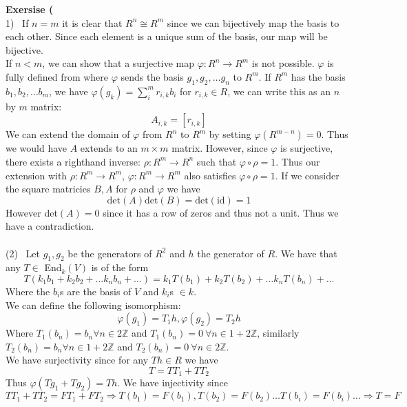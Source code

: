 \documentclass[12pt]{article}
\newenvironment{ques}[1]{\textbf{Exersise #1}\vspace{1 mm}\\ }{\bigskip}
\theoremstyle{definition}
\newcommand{\Z}{\mathbb Z}
\begin{document}
\begin{ques}{6.2}
	(1) \ If $n = m$ it is clear that $R^n \cong R^m$ since we can bijectively
	map the basis to each other. Since each element is a unique sum of the
	basis, our map will be bijective.\\
	If $n < m$, we can show that a surjective map $\varphi : R^n \to
	R^m$ is not possible. $\varphi$ is fully defined from where $\varphi$ sends
	the basis $g_1, g_2, \dots g_n$ to $R^m$. If $R^m$ has the basis $b_1,b_2, \dots
	b_m$, we have $\varphi(g_k) = \sum_i^m r_{i,k}b_i$ for $r_{i,k} \in R$, we can
	write this as an $n$ by $m$ matrix:
	$$A_{i,k} = [r_{i,k}]$$
	We can extend the domain of $\varphi$ from $R^n$ to $R^m$ by setting
	$\varphi(R^{m-n}) = 0$. Thus we would have $A$ extends to an $m \times m$
	matrix. However, since $\varphi$ is surjective, there exists a righthand
	inverse: $\rho : R^m \to R^n$ such that $\varphi \circ \rho = 1$. Thus our
	extension with $\rho: R^m \to R^m$, $\varphi: R^m \to R^m$ also satisfies
	$\varphi \circ \rho = 1$. If we consider the square matricies $B, A$
	for $\rho$ and $\varphi$ we have $$\text{det}(A) \text{det}(B) =
	\text{det}(\text{id}) = 1$$ However det$(A) = 0$ since it has a row of
	zeros and thus not a unit. Thus we have a contradiction.\\
	\\
	(2) \ Let $g_1, g_2$ be the generators of $R^2$ and $h$ the generator of
	$R$. We have that any $T \in$ End$_k(V)$ is of the form 
	$$T(k_1b_1 + k_2b_2 + \dots k_nb_n + \dots) =  k_1T(b_1) + k_2T(b_2) +
	\dots k_nT(b_n) + \dots $$
	Where the $b_i$s are the basis of $V$ and $k_i$s $\in k$.\\
	We can define the following isomorphism:\\
	$$\varphi(g_1) = T_1h, \varphi (g_2) = T_2 h$$
	Where $T_1(b_n) = b_n \forall n \in 2\Z$ and $T_1(b_n) = 0\  \forall n \in
	1 + 2\Z$, similarly $T_2(b_n) = b_n \forall n \in 1 + 2\Z$ and $T_2(b_n) =
	0\  \forall n \in 2\Z$. \\
	We have surjectivity since for any $Th \in R$ we have
	$$T = TT_1 + TT_2$$
	Thus $\varphi(Tg_1 + Tg_2) = Th$. We have injectivity since $TT_1 + TT_2 =
	FT_1 + FT_2 \Rightarrow T(b_1) = F(b_1), T(b_2) = F(b_2) \dots T(b_i) =
	F(b_i) \dots \Rightarrow T = F$

\end{ques}
\end{document}

